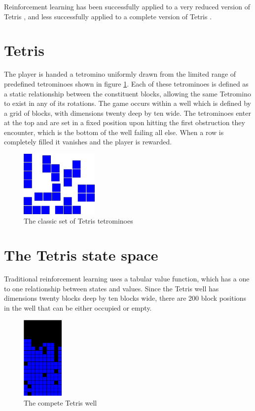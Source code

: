 \documentclass[a4paper,twocolumn]{article}
\begin{document}
Reinforcement learning has been successfully applied to a very reduced version of Tetris \citep{melaxtetris,yaeltetris}, and less successfully applied to a complete version of Tetris \citep{kurt}. 

\section{Tetris}

The player is handed a tetromino uniformly drawn from the limited range of predefined tetrominoes shown in figure \ref{fig:fulltet}. Each of these tetrominoes is defined as a static relationship between the constituent blocks, allowing the same Tetromino to exist in any of its rotations. The game occurs within a well which is defined by a grid of blocks, with dimensions twenty deep by ten wide. The tetrominoes enter at the top and are set in a fixed position upon hitting the first obstruction they encounter, which is the bottom of the well failing all else. When a row is completely filled it vanishes and the player is rewarded.

\begin{figure}[h]
\centering
\includegraphics[width=1.5in]{fullblocks.png}
\caption{The classic set of Tetris tetrominoes}
\label{fig:fulltet}
\end{figure}
  
\section{The Tetris state space}

Traditional reinforcement learning uses a tabular value function, which has a one to one relationship between states and values. Since the Tetris well has dimensions twenty blocks deep by ten blocks wide, there are 200 block positions in the well that can be either occupied or empty.

\begin{figure}[h]
\centering
\includegraphics[width=0.8in]{fullwell.png}
\caption{The compete Tetris well}
\label{fig:fullwell}
\end{figure}
\end{document}
